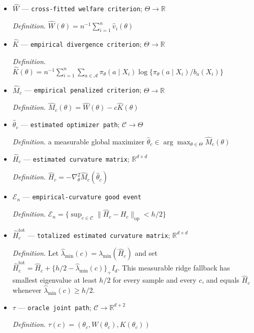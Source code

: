 \documentclass{article}
\begin{document}
\begin{itemize}
  \item \(\widehat W\) --- \texttt{cross-\allowbreak{}fitted welfare criterion}; \(\Theta\to\mathbb R\)
  \par\smallskip\noindent\emph{Definition.} \(\widehat W(\theta)=n^{-1}\sum_{i=1}^n\widehat v_i(\theta)\)
  \item \(\widehat K\) --- \texttt{empirical divergence criterion}; \(\Theta\to\mathbb R\)
  \par\smallskip\noindent\emph{Definition.} \(\widehat K(\theta)=n^{-1}\sum_{i=1}^n\sum_{a\in\mathcal A}\pi_\theta(a\mid X_i)\log\{\pi_\theta(a\mid X_i)/b_a(X_i)\}\)
  \item \(\widehat M_c\) --- \texttt{empirical penalized criterion}; \(\Theta\to\mathbb R\)
  \par\smallskip\noindent\emph{Definition.} \(\widehat M_c(\theta)=\widehat W(\theta)-c\widehat K(\theta)\)
  \item \(\widehat\theta_c\) --- \texttt{estimated optimizer path}; \(\mathcal C\to\Theta\)
  \par\smallskip\noindent\emph{Definition.} a measurable global maximizer \(\widehat\theta_c\in\arg\max_{\theta\in\Theta}\widehat M_c(\theta)\)
  \item \(\widehat H_c\) --- \texttt{estimated curvature matrix}; \(\mathbb R^{d\times d}\)
  \par\smallskip\noindent\emph{Definition.} \(\widehat H_c=-\nabla_\theta^2\widehat M_c(\widehat\theta_c)\)
  \item \(\mathcal E_n\) --- \texttt{empirical-\allowbreak{}curvature good event}
  \par\smallskip\noindent\emph{Definition.} \(\mathcal E_n=\{\sup_{c\in\mathcal C}\|\widehat H_c-H_c\|_{\mathrm{op}}<h/2\}\)
  \item \(\widehat H_c^{\mathrm{tot}}\) --- \texttt{totalized estimated curvature matrix}; \(\mathbb R^{d\times d}\)
  \par\smallskip\noindent\emph{Definition.} Let \(\widehat\lambda_{\min}(c)=\lambda_{\min}(\widehat H_c)\) and set \(\widehat H_c^{\mathrm{tot}}=\widehat H_c+\{h/2-\widehat\lambda_{\min}(c)\}_+I_d\). This measurable ridge fallback has smallest eigenvalue at least \(h/2\) for every sample and every \(c\), and equals \(\widehat H_c\) whenever \(\widehat\lambda_{\min}(c)\ge h/2\).
  \item \(\tau\) --- \texttt{oracle joint path}; \(\mathcal C\to\mathbb R^{d+2}\)
  \par\smallskip\noindent\emph{Definition.} \(\tau(c)=(\theta_c,W(\theta_c),K(\theta_c))\)

\end{itemize}
\end{document}
